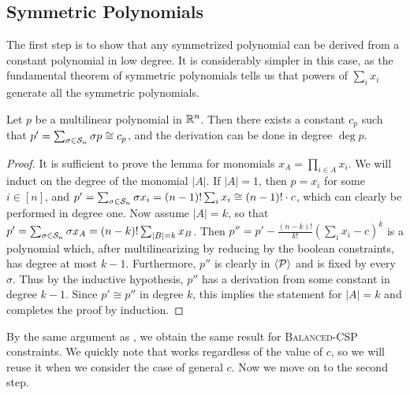 \subsection{Symmetric Polynomials}
The first step is to show that any symmetrized polynomial can be derived from a constant polynomial in low degree. It is considerably simpler in this case, as the fundamental theorem of symmetric polynomials tells us that powers of $\sum_i x_i$ generate all the symmetric polynomials. 
\begin{lemma}\label{lem:bcsp-symmetric}
Let $p$ be a multilinear polynomial in $\mathbb R^n$. Then there exists a constant $c_p$ such that $p' = \sum_{\sigma \in \mathcal S_n} \sigma p \cong c_p$, and the derivation can be done in degree $\deg p$. 
\end{lemma}
\begin{proof}
It is sufficient to prove the lemma for monomials $x_A = \prod_{i \in A} x_i$. We will induct on the degree of the monomial $|A|$. 
If $|A| = 1$, then $p = x_i$ for some $i \in [n]$, and $p' = \sum_{\sigma \in \mathcal S_n} \sigma x_i = (n-1)!\sum_i x_i \cong (n-1)!\cdot c$, which can clearly be performed in degree one. Now assume $|A| = k$, so that $p' = \sum_{\sigma \in \mathcal S_n} \sigma x_A = (n-k)! \sum_{|B|=k} x_B$. Then $p'' = p' - \frac{(n-k)!}{k!}\left(\sum_i x_i - c\right)^k$ is a polynomial which, after multilinearizing by reducing by the boolean constraints, has degree at most $k-1$. Furthermore, $p''$ is clearly in $\langle \mathcal P \rangle$ and is fixed by every $\sigma$. Thus by the inductive hypothesis, $p''$ has a derivation from some constant in degree $k-1$. Since $p' \cong p''$ in degree $k$, this implies the statement for $|A| = k$ and completes the proof by induction.
\end{proof}
By the same argument as , we obtain the same result for \textsc{Balanced-CSP} constraints. We quickly note that  works regardless of the value of $c$, so we will reuse it when we consider the case of general $c$. Now we move on to the second step.

